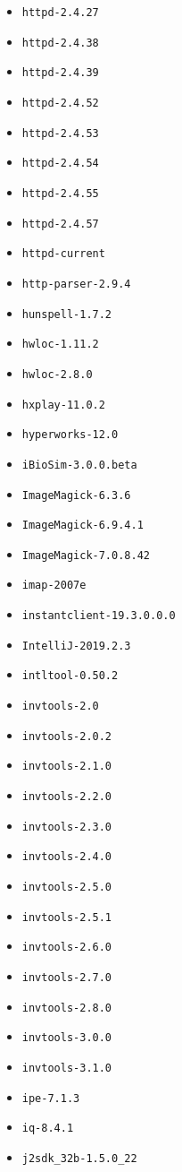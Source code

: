 \begin{multicols}{3}
\begin{itemize}
\item \verb|httpd-2.4.27|
\item \verb|httpd-2.4.38|
\item \verb|httpd-2.4.39|
\item \verb|httpd-2.4.52|
\item \verb|httpd-2.4.53|
\item \verb|httpd-2.4.54|
\item \verb|httpd-2.4.55|
\item \verb|httpd-2.4.57|
\item \verb|httpd-current|
\item \verb|http-parser-2.9.4|
\item \verb|hunspell-1.7.2|
\item \verb|hwloc-1.11.2|
\item \verb|hwloc-2.8.0|
\item \verb|hxplay-11.0.2|
\item \verb|hyperworks-12.0|
\item \verb|iBioSim-3.0.0.beta|
\item \verb|ImageMagick-6.3.6|
\item \verb|ImageMagick-6.9.4.1|
\item \verb|ImageMagick-7.0.8.42|
\item \verb|imap-2007e|
\item \verb|instantclient-19.3.0.0.0|
\item \verb|IntelliJ-2019.2.3|
\item \verb|intltool-0.50.2|
\item \verb|invtools-2.0|
\item \verb|invtools-2.0.2|
\item \verb|invtools-2.1.0|
\item \verb|invtools-2.2.0|
\item \verb|invtools-2.3.0|
\item \verb|invtools-2.4.0|
\item \verb|invtools-2.5.0|
\item \verb|invtools-2.5.1|
\item \verb|invtools-2.6.0|
\item \verb|invtools-2.7.0|
\item \verb|invtools-2.8.0|
\item \verb|invtools-3.0.0|
\item \verb|invtools-3.1.0|
\item \verb|ipe-7.1.3|
\item \verb|iq-8.4.1|
\item \verb|j2sdk_32b-1.5.0_22|

\end{itemize}
\end{multicols}

